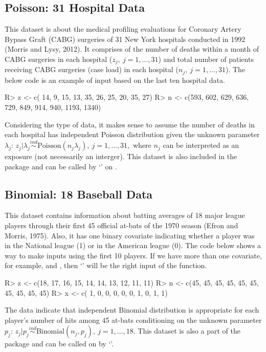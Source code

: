 \documentclass[article]{jss}
\begin{document}
\subsection{Poisson: 31 Hospital Data}
This dataset is about the medical profiling evaluations for Coronary Artery Bypass Graft (CABG) surgeries of 31 New York hospitals conducted in 1992 (Morris and Lysy, 2012). It comprises of the number of deaths within a month of CABG surgeries in each hospital ($z_{j},~j=1, \ldots, 31$) and total number of patients receiving CABG surgeries (case load) in each hospital ($n_{j},~j=1, \ldots, 31$). The below code is an example of input based on the last ten hospital data.
\begin{CodeChunk}
\begin{CodeInput}
R> z <- c( 14,   9,  15,  13,  35,  26,  25,  20,   35,   27)
R> n <- c(593, 602, 629, 636, 729, 849, 914, 940, 1193, 1340)
\end{CodeInput}
\end{CodeChunk}


Considering the type of data, it makes sense to assume the number of deaths in each hospital has independent Poisson distribution given the unknown parameter $\lambda_{j}$: $z_{j}\vert \lambda_{j}\stackrel{ind}{\sim} \textrm{Poisson}(n_{j}\lambda_{j}), ~j=1, \ldots, 31,$ where $n_{j}$ can be interpreted as an exposure (not necessarily an interger). This dataset is also included in the package and can be called by `' on .

\subsection{Binomial: 18 Baseball Data}
This dataset contains information about batting averages of 18 major league players through their first 45 official at-bats of the 1970 season (Efron and Morris, 1975). Also, it has one binary covariate indicating whether a player was in the National league (1) or in the American league (0). The code below shows a way to make inputs using the first 10 players. If we have more than one covariate, for example,  and , then `' will be the right input of the  function.
\begin{CodeChunk}
\begin{CodeInput}
R> z <- c(18, 17, 16, 15, 14, 14, 13, 12, 11, 11)
R> n <- c(45, 45, 45, 45, 45, 45, 45, 45, 45, 45)
R> x <- c( 1,  0,  0,  0,  0,  0,  1,  0,  1,  1) 
\end{CodeInput}
\end{CodeChunk}
The data indicate that independent Binomial distribution is appropriate for each player's number of hits among 45 at-bats conditioning on the unknown parameter $p_{j}$: $z_{j}\vert p_{j}\stackrel{ind}{\sim} \textrm{Binomial}(n_{j}, p_{j}), ~j=1, \ldots, 18$. This dataset is also a part of the package and can be called on  by `'.
\end{document}
